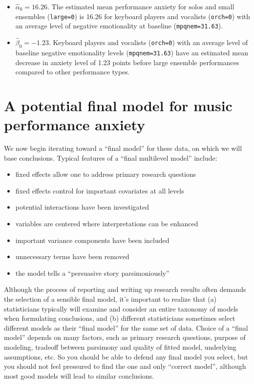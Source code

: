 \documentclass[
]{krantz}
\providecommand{\tightlist}{%
  \setlength{\itemsep}{0pt}\setlength{\parskip}{0pt}}
\begin{document}
\begin{itemize}
\tightlist
\item
  \(\hat{\alpha}_{0} = 16.26\). The estimated mean performance anxiety for solos and small ensembles (\texttt{large=0}) is 16.26 for keyboard players and vocalists (\texttt{orch=0}) with an average level of negative emotionality at baseline (\texttt{mpqnem=31.63}).
\item
  \(\hat{\beta}_{0} = -1.23\). Keyboard players and vocalists (\texttt{orch=0}) with an average level of baseline negative emotionality levels (\texttt{mpqnem=31.63}) have an estimated mean decrease in anxiety level of 1.23 points before large ensemble performances compared to other performance types.
\end{itemize}

\hypertarget{modelf}{%
\section{A potential final model for music performance anxiety}\label{modelf}}

We now begin iterating toward a ``final model'' for these data, on which we will base conclusions. Typical features of a ``final multilevel model'' include:

\begin{itemize}
\tightlist
\item
  fixed effects allow one to address primary research questions
\item
  fixed effects control for important covariates at all levels
\item
  potential interactions have been investigated
\item
  variables are centered where interpretations can be enhanced
\item
  important variance components have been included
\item
  unnecessary terms have been removed
\item
  the model tells a ``persuasive story parsimoniously''
\end{itemize}

Although the process of reporting and writing up research results often demands the selection of a sensible final model, it's important to realize that (a) statisticians typically will examine and consider an entire taxonomy of models when formulating conclusions, and (b) different statisticians sometimes select different models as their ``final model'' for the same set of data. Choice of a ``final model'' depends on many factors, such as primary research questions, purpose of modeling, tradeoff between parsimony and quality of fitted model, underlying assumptions, etc. So you should be able to defend any final model you select, but you should not feel pressured to find the one and only ``correct model'', although most good models will lead to similar conclusions.
\end{document}
